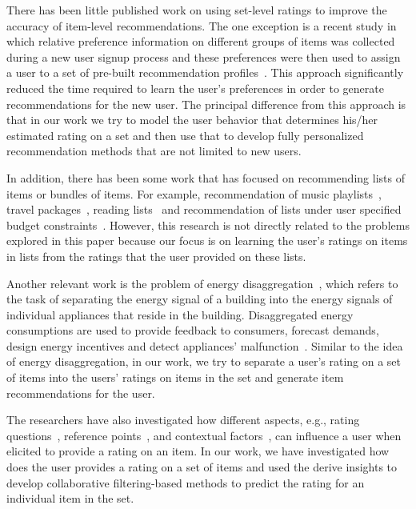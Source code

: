 \fi

There has been little published work on using set-level ratings to improve the
accuracy of item-level recommendations. The one exception is a recent study in which relative
preference information on different groups of items was collected during a new user
signup process and these preferences were then used to assign a user to a set of
pre-built recommendation profiles~\cite{r53}. 
This approach significantly reduced the time required to learn the user's
preferences in order to generate recommendations for the new user.
The principal difference from this 
approach is that in our work we try to model the user behavior that determines
his/her estimated rating on a set and then use that to develop fully
personalized recommendation methods that are not limited to new users.

In addition, there has been some work that  has focused on recommending
lists of items or bundles of items. For example, recommendation of music
playlists~\cite{r55,moore2012learning,aizenberg2012build}, travel
packages~\cite{interdonato2013versatile,r54,liu2011personalized,xie2011comprec}, reading
lists~\cite{r56} and recommendation of lists under user specified budget
constraints~\cite{xie2010breaking,BenouaretRecsys16}.
However, this research is not directly related to the problems explored in this
paper because our focus is on learning the user's ratings on items in lists from
the ratings that the user provided on these lists.

Another relevant work is the problem of energy disaggregation~\cite{hart1992nonintrusive}, 
which refers to the task
of separating the energy signal of a building into the energy signals of
individual appliances that reside in the building. Disaggregated energy
consumptions are used to provide feedback to consumers,  forecast demands,
design energy incentives and detect appliances'
malfunction~\cite{froehlich2011disaggregated,darby2006effectiveness}. Similar to
the idea of energy disaggregation, in our work, we try to separate a user's rating on a set of
items into the users' ratings on items in the set and generate item
recommendations for the user.

The researchers have also investigated how different aspects, e.g., rating
questions~\cite{bellogin2014magic}, reference
points~\cite{adomavicius2011recommender,cosley2003seeing,nguyen2013rating}, and
contextual factors~\cite{Winoto2010RUM}, can influence a user when
elicited to provide a rating on an item. In our work, we have investigated how
does the user provides a rating on a set of items and used the derive insights to develop
collaborative filtering-based methods to predict the rating for an individual
item in the set.

